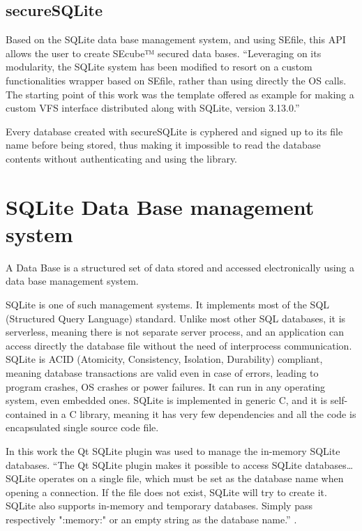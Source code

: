 \subsection{secureSQLite}

Based on the SQLite data base management system, and using SEfile, this API allows the user to create SEcube™ secured data bases.
``Leveraging on its modularity, the SQLite system has been modified to resort on a custom functionalities wrapper based on SEfile, rather than using directly the OS calls. The starting point of this work was the template offered as example for making a custom VFS interface distributed along with SQLite, version 3.13.0.''\cite{L2UserMan}

Every database created with secureSQLite is cyphered and signed up to its file name before being stored, thus making it impossible to read the database contents without authenticating and using the library.

\section{SQLite Data Base management system}
A Data Base is a structured set of data stored and accessed electronically using a data base management system. 

SQLite \cite{SQLite} is one of such management systems. It implements most of the SQL (Structured Query Language) standard. Unlike most other SQL databases, it is serverless, meaning there is not separate server process, and an application can access directly the database file without the need of interprocess communication. SQLite is ACID (Atomicity, Consistency, Isolation, Durability) compliant, meaning database transactions are valid even in case of errors, leading to program crashes, OS crashes or power failures. It can run in any operating system, even embedded ones. SQLite is implemented in generic C, and it is self-contained in a C library, meaning it has very few dependencies and all the code is encapsulated single source code file. 

In this work the Qt SQLite plugin was used to manage the in-memory SQLite databases. ``The Qt SQLite plugin makes it possible to access SQLite databases\dots SQLite operates on a single file, which must be set as the database name when opening a connection. If the file does not exist, SQLite will try to create it. SQLite also supports in-memory and temporary databases. Simply pass respectively ":memory:" or an empty string as the database name.'' \cite{qsqlite}.

